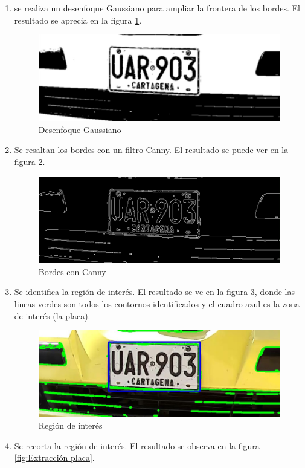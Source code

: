 \begin{enumerate}
     \item  se realiza un desenfoque Gaussiano para ampliar la frontera de los bordes. El resultado se aprecia en la figura \ref{fig:Desenfoque Gaussiano}.
     
     \begin{figure}[H]
    \centering
    \includegraphics[width=0.5 \linewidth]{imagenes/MODELO_4/segmentacion/suavi.jpg} 
    \caption{Desenfoque Gaussiano}
    \label{fig:Desenfoque Gaussiano}
    \end{figure}
     
     \item Se resaltan los bordes con un filtro Canny. El resultado se puede ver en la figura \ref{fig:Bordes con Canny}.
     
     \begin{figure}[H]
    \centering
    \includegraphics[width=0.5 \linewidth]{imagenes/MODELO_4/segmentacion/borde.jpg} 
    \caption{Bordes con Canny}
    \label{fig:Bordes con Canny}
    \end{figure}
    
     \item Se identifica la región de interés. El resultado se ve en la figura \ref{fig:Region ROI}, donde las lineas verdes son todos los contornos identificados y el cuadro  azul es la zona de interés (la placa).
     
     \begin{figure}[H]
    \centering
    \includegraphics[width=0.5 \linewidth]{imagenes/MODELO_4/segmentacion/roi.jpg}
    \caption{Región de interés}
    \label{fig:Region ROI}
    \end{figure}

    
    \item Se recorta la región de interés. El resultado se observa en la figura \ref{fig:Extracción placa}.
     

\end{enumerate}
